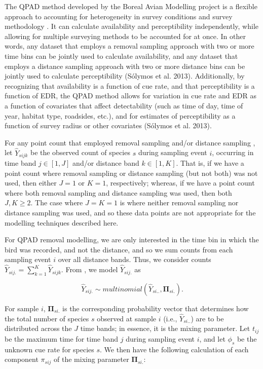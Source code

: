 \par The QPAD method developed by the Boreal Avian Modelling project is a flexible approach to accounting for heterogeneity in survey conditions and survey methodology \citep{solymos_calibrating_2013}. It can calculate availability and perceptibility independently, while allowing for multiple surveying methods to be accounted for at once. In other words, any dataset that employs a removal sampling approach with two or more time bins can be jointly used to calculate availability, and any dataset that employs a distance sampling approach with two or more distance bins can be jointly used to calculate perceptibility (Sólymos et al. 2013). Additionally, by recognizing that availability is a function of cue rate, and that perceptibility is a function of EDR, the QPAD method allows for variation in cue rate and EDR as a function of covariates that affect detectability (such as time of day, time of year, habitat type, roadsides, etc.), and for estimates of perceptibility as a function of survey radius or other covariates (Sólymos et al. 2013). 

\par For any point count that employed removal sampling \citep{alldredge_time--detection_2007, farnsworth_removal_2002} and/or distance sampling \citep{buckland_introduction_2001, buckland_distance_2015}, let $\hat{Y}_{sijk}$ be the observed count of species $s$ during sampling event $i$, occurring in time band $j \in [1,J]$ and/or distance band $k \in [1,K]$.
That is, if we have a point count where removal sampling or distance sampling (but not both) was not used, then either $J = 1$ or $K = 1$, respectively; whereas, if we have a point count where both removal sampling and distance sampling was used, then both $J,K \geq 2$.
The case where $J = K = 1$ is where neither removal sampling nor distance sampling was used, and so these data points are not appropriate for the modelling techniques described here.

\par For QPAD removal modelling, we are only interested in the time bin in which the bird was recorded, and not the distance, and so we sum counts from each sampling event $i$ over all distance bands. 
Thus, we consider counts $\hat{Y}_{sij.} = \sum_{k=1}^{K} \hat{Y}_{sijk}$. 
From \citet{solymos_calibrating_2013}, we model $\hat{Y}_{sij.}$ as

$$\hat{Y}_{sij.} \sim multinomial\left(\hat{Y}_{si..}, \mathbf{\Pi}_{si.}\right).$$

\par For sample $i$, $\mathbf{\Pi}_{si.}$ is the corresponding probability vector that determines how the total number of species $s$ observed at sample $i$ (i.e., $\hat{Y}_{si..}$) are to be distributed across the $J$ time bands; in essence, it is the mixing parameter.
Let $t_{ij}$ be the maximum time for time band $j$ during sampling event $i$, and let $\phi_s$ be the unknown cue rate for species $s$.
We then have the following calculation of each component $\pi_{sij}$ of the mixing parameter $\mathbf{\Pi}_{si.}$:

